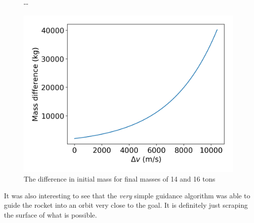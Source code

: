 \documentclass[11pt]{article}
\newlength{\offsetpage}
\newenvironment{widepage}{\begin{adjustwidth}{-\offsetpage}{-\offsetpage}%
    \addtolength{\textwidth}{2\offsetpage}}%
{\end{adjustwidth}}
\begin{document}
\begin{figure}[H]
\begin{widepage}
\begin{minipage}{0.45\textwidth}
      \includegraphics[width=\textwidth]{./plots/consumedToInitial_diff.png}
      \caption{The difference in initial mass for final masses of 14 and 16 tons}
    \end{minipage}
  \end{widepage}
\end{figure}

It was also interesting to see that the \textit{very} simple guidance algorithm was able to guide the rocket into an orbit very close to the goal.
It is definitely just scraping the surface of what is possible.
\begingroup
\raggedright
{}
\endgroup
\end{document}
